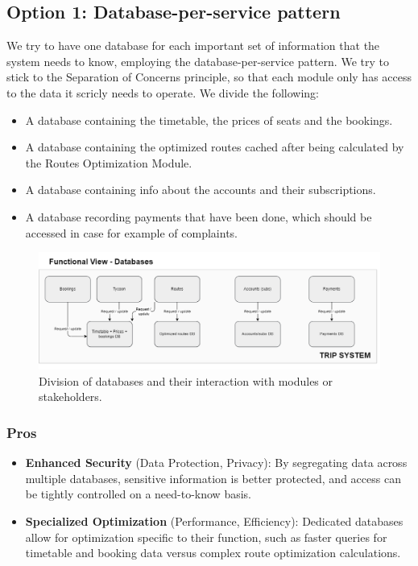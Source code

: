 \subsection*{Option 1: Database-per-service pattern}
We try to have one database for each important set of information that the system needs to know, employing the database-per-service pattern.
We try to stick to the Separation of Concerns principle, so that each module only has access to the data it scricly needs to operate.
We divide the following:
\begin{itemize}
    \item A database containing the timetable, the prices of seats and the bookings.
    \item A database containing the optimized routes cached after being calculated by the Routes Optimization Module.
    \item A database containing info about the accounts and their subscriptions. 
    \item A database recording payments that have been done, which should be accessed in case for example of complaints. 
\end{itemize}
\begin{figure}[ht]
    \centering
    \includegraphics[width=\textwidth]{drawings/views_draft2/functional_view databases.png}
    \caption{Division of databases and their interaction with modules or stakeholders.}
    \label{fig:databases_view}
\end{figure}

\subsubsection*{Pros}
\begin{itemize}[noitemsep]
    \item \textbf{Enhanced Security} (Data Protection, Privacy): By segregating data across multiple databases, sensitive information is better protected, and access can be tightly controlled on a need-to-know basis.
    \item \textbf{Specialized Optimization} (Performance, Efficiency): Dedicated databases allow for optimization specific to their function, such as faster queries for timetable and booking data versus complex route optimization calculations.
\end{itemize}


